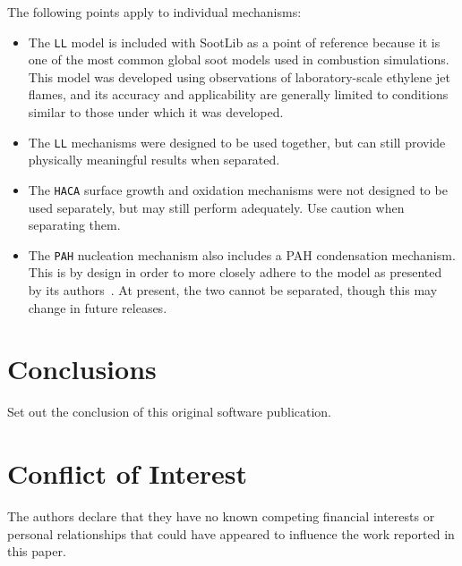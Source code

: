 \documentclass[preprint,letterpaper]{elsarticle}
\begin{document}
The following points apply to individual mechanisms:
\begin{itemize}
    \item The \texttt{LL} model is included with SootLib as a point of reference because it is one of the most common global soot models used in combustion simulations. This model was developed using observations of laboratory-scale ethylene jet flames, and its accuracy and applicability are generally limited to conditions similar to those under which it was developed.
    \item The \texttt{LL} mechanisms were designed to be used together, but can still provide physically meaningful results when separated.
    \item The \texttt{HACA} surface growth and oxidation mechanisms were not designed to be used separately, but may still perform adequately. Use caution when separating them.
    \item The \texttt{PAH} nucleation mechanism also includes a PAH condensation mechanism. This is by design in order to more closely adhere to the model as presented by its authors~\cite{Blanquart_2009c}. At present, the two cannot be separated, though this may change in future releases.
\end{itemize}



\section{Conclusions}
\label{s:conclusions}

Set out the conclusion of this original software publication.


\section{Conflict of Interest}


The authors declare that they have no known competing financial interests or personal relationships that could have appeared to influence the work reported in this paper.
\end{document}
